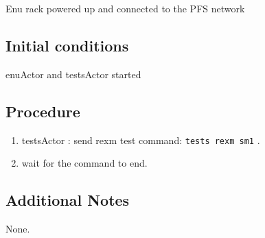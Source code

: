 Enu rack powered up and connected to the PFS network

\subsection{Initial conditions}
enuActor and testsActor started

\subsection{Procedure}

\begin{enumerate}
    \item testsActor : send rexm test command: \texttt{tests rexm sm1} .
    \item wait for the command to end.
\end{enumerate}



\subsection{Additional Notes}

None.
